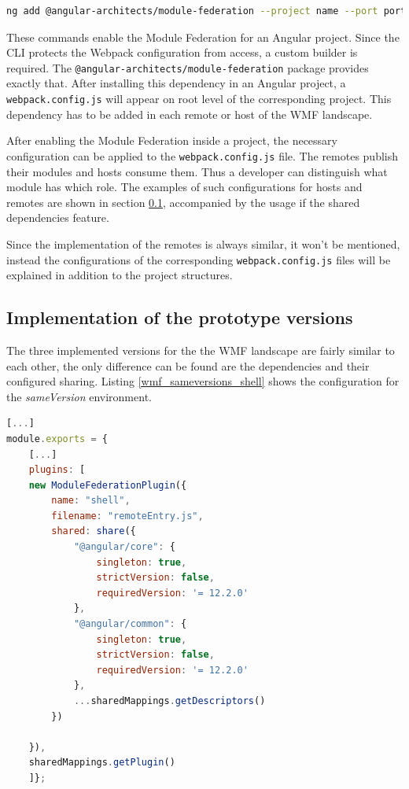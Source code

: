 \begin{lstlisting}[language=Bash, caption=Angular CLI console command to enable Module Federation in an Angular project, label=angluar_wmf_command]
ng add @angular-architects/module-federation --project name --port port
\end{lstlisting}

These commands enable the Module Federation for an Angular project. Since the CLI protects the Webpack configuration from access, a custom builder is required. The \texttt{@angular-architects/module-federation} package provides exactly that.
After installing this dependency in an Angular project, a \texttt{webpack.config.js} will appear on root level of the corresponding project.\cite{wmf_angular_dependency_install}
This dependency has to be added in each remote or host of the WMF landscape. 

After enabling the Module Federation inside a project, the necessary configuration can be applied to the \texttt{webpack.config.js} file. The remotes publish their modules and hosts consume them. Thus a developer can distinguish what module has which role.
The examples of such configurations for hosts and remotes are shown in section \ref{wmf_implementation_prototype}, accompanied by the usage if the shared dependencies feature.

Since the implementation of the remotes is always similar, it won't be mentioned, instead the configurations of the corresponding \texttt{webpack.config.js} files will be explained in addition to the project structures.

\subsection{Implementation of the prototype versions}
\label{wmf_implementation_prototype}

The three implemented versions for the the WMF landscape are fairly similar to each other, the only difference can be found are the dependencies and their configured sharing. Listing \ref{wmf_sameversions_shell} shows the configuration for the \textit{sameVersion} environment.

\begin{lstlisting}[language=JavaScript, caption=Content of \texttt{webpack.config.js} of the shell of the same versions WMF project, label=wmf_sameversions_shell]
[...]
module.exports = {
	[...]
	plugins: [
	new ModuleFederationPlugin({
		name: "shell",
		filename: "remoteEntry.js",
		shared: share({
			"@angular/core": { 
				singleton: true, 
				strictVersion: false, 
				requiredVersion: '= 12.2.0'
			},
			"@angular/common": { 
				singleton: true, 
				strictVersion: false, 
				requiredVersion: '= 12.2.0' 
			},
			...sharedMappings.getDescriptors()
		})
		
	}),
	sharedMappings.getPlugin()
	]};
\end{lstlisting}

